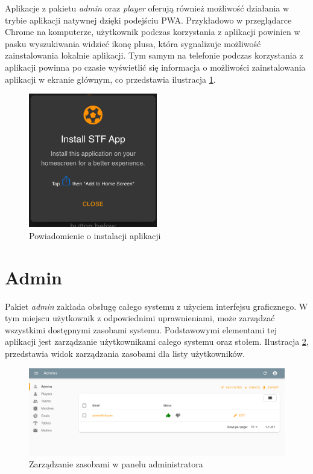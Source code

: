 Aplikacje z pakietu \textit{admin} oraz \textit{player} oferują również możliwość działania w trybie aplikacji natywnej dzięki podejściu PWA. Przykładowo w przeglądarce Chrome na komputerze, użytkownik podczas korzystania z aplikacji powinien w pasku wyszukiwania widzieć ikonę plusa, która sygnalizuje możliwość zainstalowania lokalnie aplikacji. Tym samym na telefonie podczas korzystania z aplikacji powinna po czasie wyświetlić się informacja o możliwości zainstalowania aplikacji w ekranie głównym, co przedstawia ilustracja \ref{fig:pwa_promt}.

\begin{figure}[h!]
  \centering
    \includegraphics[width=0.5\textwidth]{images/player/PWA_promt.png}
  \caption{Powiadomienie o instalacji aplikacji}
  \label{fig:pwa_promt}
\end{figure}


\section{Admin}

Pakiet \textit{admin} zakłada obsługę całego systemu z użyciem interfejsu graficznego. W tym miejscu użytkownik z odpowiednimi uprawnieniami, może zarządzać wszystkimi dostępnymi zasobami systemu. Podstawowymi elementami tej aplikacji jest zarządzanie użytkownikami całego systemu oraz stołem. Ilustracja \ref{fig:admin-manage-resource}, przedstawia widok zarządzania zasobami dla listy użytkowników.

\begin{figure}[h!]
  \centering
    \includegraphics[width=\textwidth]{images/admin/adminsList.png}
  \caption{Zarządzanie zasobami w panelu administratora}
  \label{fig:admin-manage-resource}
\end{figure}

